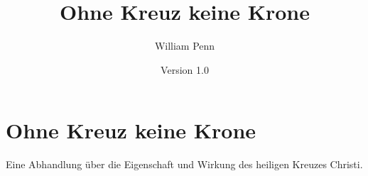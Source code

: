 \documentclass[a5paper,pagesize,10pt]{scrbook}
\begin{document}
\author{William Penn}
\title{Ohne Kreuz keine Krone}
\date{Version 1.0}

\maketitle

\frontmatter

\tableofcontents




\mainmatter
\part{Ohne Kreuz keine Krone}
Eine Abhandlung über die Eigenschaft und Wirkung des
heiligen Kreuzes Christi.





















\backmatter

\printindex
\end{document}
